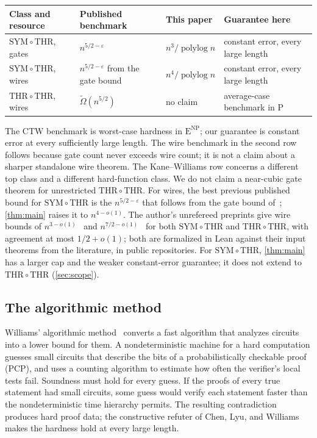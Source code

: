 \documentclass[11pt,letterpaper]{article}
\theoremstyle{definition}
\theoremstyle{remark}
\newcommand{\THR}{\mathrm{THR}}
\newcommand{\SYM}{\mathrm{SYM}}
\newcommand{\ENP}{\mathrm{E}^{\mathrm{NP}}}
\newcommand{\polylog}{\operatorname{polylog}}
\begin{document}
\begin{center}\small
\begin{tabularx}{\textwidth}{@{}>{\raggedright\arraybackslash}p{}
 >{\raggedright\arraybackslash}p{}XX@{}}
\toprule
Class and resource & Published benchmark & This paper & Guarantee here\\
\midrule
\(\SYM\circ\THR\), gates & \(n^{5/2-\varepsilon}\)~\cite{CTW26} & \(n^3/\polylog n\) & constant error, every large length\\
\(\SYM\circ\THR\), wires & \(n^{5/2-\varepsilon}\) from the gate bound~\cite{CTW26} & \(n^4/\polylog n\) & constant error, every large length\\
\(\THR\circ\THR\), wires & \(\widetilde\Omega(n^{5/2})\)~\cite{KW16} & no claim & average-case benchmark in \(\mathrm P\)\\
\bottomrule
\end{tabularx}
\end{center}
The CTW benchmark is worst-case hardness in \(\ENP\); our guarantee
is constant error at every sufficiently large length. The wire
benchmark in the second row follows because gate count never exceeds wire count; it is not a claim about a sharper
standalone wire theorem. The Kane--Williams row concerns a different
top class and a different hard-function class. We do not claim a
near-cubic gate theorem for unrestricted \(\THR\circ\THR\).
For wires, the best previous published bound for \(\SYM\circ\THR\) is the \(n^{5/2-\varepsilon}\) that follows from the gate bound of~\cite{CTW26}; \cref{thm:main} raises it to \(n^{4-o(1)}\).
The author's unrefereed preprints give wire bounds of
\(n^{3-o(1)}\)~\cite{NagCubic} and \(n^{7/2-o(1)}\)~\cite{Nag72} for
both \(\SYM\circ\THR\) and \(\THR\circ\THR\), with agreement at most
\(1/2+o(1)\); both are formalized in Lean against their input theorems from the literature, in public repositories. For \(\SYM\circ\THR\), \cref{thm:main} has a larger cap
and the weaker constant-error guarantee; it does not extend to
\(\THR\circ\THR\) (\cref{sec:scope}).

\subsection{The algorithmic method}\label{sec:method}

Williams' algorithmic method~\cite{Wil13} converts a fast algorithm
that analyzes circuits into a lower bound for them. A nondeterministic
machine for a hard computation guesses small circuits that describe
the bits of a probabilistically checkable proof (PCP), and uses a
counting algorithm to estimate how often the verifier's local tests
fail. Soundness must hold for every guess. If the proofs of every true
statement had small circuits, some guess would verify each statement
faster than the nondeterministic time hierarchy permits. The resulting
contradiction produces hard proof data; the constructive refuter of
Chen, Lyu, and Williams~\cite{CLW20} makes the hardness hold at every
large length.
\end{document}
